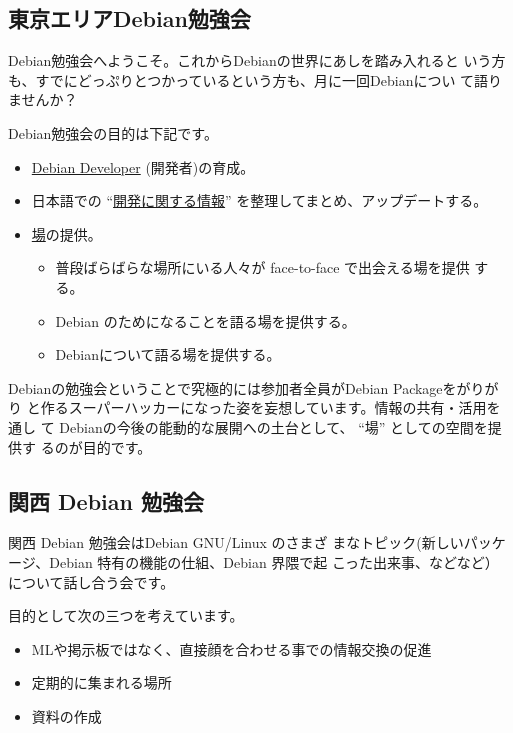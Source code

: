 \documentclass[mingoth,a4paper]{jsarticle}
\begin{document}

\subsection{東京エリアDebian勉強会}

 Debian勉強会へようこそ。これからDebianの世界にあしを踏み入れると
 いう方も、すでにどっぷりとつかっているという方も、月に一回Debianについ
 て語りませんか？

 Debian勉強会の目的は下記です。

\begin{itemize}
 \item \underline{Debian Developer} (開発者)の育成。
 \item 日本語での ``\underline{開発に関する情報}'' を整理してまとめ、アップデートする。
 \item \underline{場}の提供。
 \begin{itemize}
  \item 普段ばらばらな場所にいる人々が face-to-face で出会える場を提供
	する。
  \item Debian のためになることを語る場を提供する。
  \item Debianについて語る場を提供する。
 \end{itemize}
\end{itemize}

 Debianの勉強会ということで究極的には参加者全員がDebian Packageをがりがり
 と作るスーパーハッカーになった姿を妄想しています。情報の共有・活用を通し
 て Debianの今後の能動的な展開への土台として、 ``場'' としての空間を提供す
 るのが目的です。

\subsection{関西 Debian 勉強会}

 関西 Debian 勉強会はDebian GNU/Linux のさまざ
 まなトピック(新しいパッケージ、Debian 特有の機能の仕組、Debian 界隈で起
 こった出来事、などなど）について話し合う会です。

 目的として次の三つを考えています。
 \begin{itemize}
  \item MLや掲示板ではなく、直接顔を合わせる事での情報交換の促進
  \item 定期的に集まれる場所
  \item 資料の作成
 \end{itemize}
\end{document}
